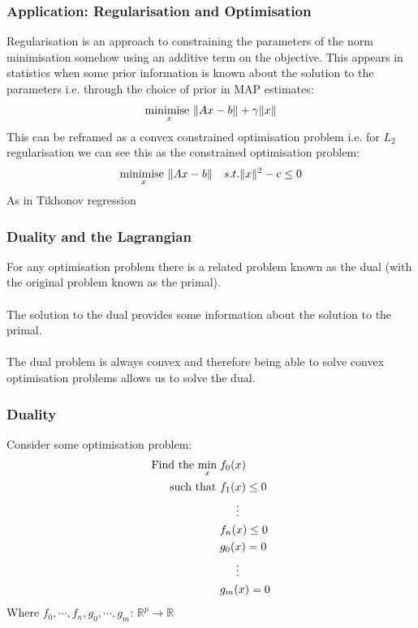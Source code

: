 \documentclass{beamer}
\DeclarePairedDelimiter\norm{\lVert}{\rVert}
\def\rnum{\mathbb{R}}
\begin{document}
\begin{frame}
    \frametitle{Application: Regularisation and Optimisation}
    Regularisation is an approach to constraining the parameters of the norm
    minimisation somehow using an additive term on the objective. This appears
    in statistics when some prior information is known about the solution to the
    parameters i.e. through the choice of prior in MAP estimates:
    \begin{align*}
        \underset{x}{\text{minimise }} \norm{Ax - b}+ \gamma\norm{x}
    \end{align*}
    This can be reframed as a convex constrained optimisation problem i.e. for
    $L_{2}$ regularisation we can see this as the constrained optimisation
    problem:
    \begin{align*}
        &\underset{x}{\text{minimise }} \norm{Ax - b}
        &s.t. \norm{x}^{2} - c \leq 0
    \end{align*}
    As in Tikhonov regression
\end{frame}

\begin{frame}
    \frametitle{Duality and the Lagrangian}
    For any optimisation problem there is a related problem known as the dual
    (with the original problem known as the primal).
    \\~\\
    The solution to the dual provides some information about the solution to the
    primal.
    \\~\\
    The dual problem is always convex and therefore being able to solve
    convex optimisation problems allows us to solve the dual.
\end{frame}

\begin{frame}
    \frametitle{Duality}
    Consider some optimisation problem:
    {\footnotesize
    \begin{align*}
        \text{Find the }\underset{x}{\text{min}}\; &f_{0}(x) \\
        \text{  such that }&f_{1}(x) \leq 0 \\
        & \hspace{5mm} \vdots \\
        &f_{n}(x) \leq 0 \\
        &g_{0}(x) = 0 \\
        &\hspace{5mm} \vdots \\
        &g_{m}(x) = 0
    \end{align*}}
    Where $f_0,\cdots, f_n, g_0, \cdots, g_m:\, \rnum^{p} \rightarrow \rnum$
\end{frame}
\end{document}
